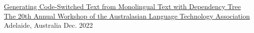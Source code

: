 

\begin{cventries}

  \cventry
    {\href{https://aclanthology.org/2022.alta-1.12/}{Generating Code-Switched Text from Monolingual Text with Dependency Tree}} %
    {\href{https://alta2022.alta.asn.au/}{The 20th Annual Workshop of the Australasian Language Technology Association}} %
    {Adelaide, Australia} %
    {Dec. 2022} %
    {}

\end{cventries}
